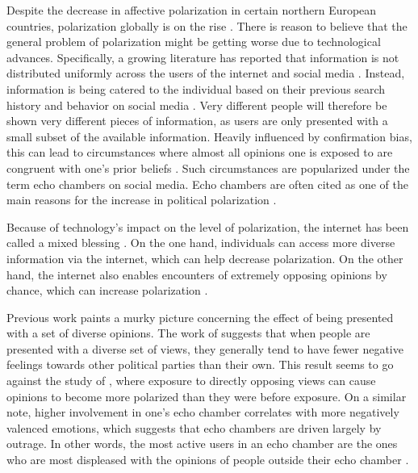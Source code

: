 \documentclass[11pt]{article}
\begin{document}
\noindent Despite the decrease in affective polarization in certain northern European countries, polarization globally is on the rise \cite{boxell_cross-country_2020,mccoy_polarization_2018, somer_deja_2018}. There is reason to believe that the general problem of polarization might be getting worse due to technological advances.
Specifically, a growing literature has reported that information is not distributed uniformly across the users of the internet and social media \cite{taylor_exploring_2018, sasahara_social_2021,baumann_modeling_2020,tsai_echo_2020}. Instead, information is being catered to the individual based on their previous search history and behavior on social media \cite{geschke2019triple}. Very different people will therefore be shown very different pieces of information, as users are only presented with a small subset of the available information. 
Heavily influenced by confirmation bias, this can lead to circumstances where almost all opinions one is exposed to are congruent with one's prior beliefs \cite{baumann_modeling_2020}. Such circumstances are popularized under the term echo chambers on social media. Echo chambers are often cited as one of the main reasons for the increase in political polarization \cite{baumann_modeling_2020, sasahara_social_2021, tsai_echo_2020, geschke2019triple}. 

Because of technology's impact on the level of polarization, the internet has been called a mixed blessing \cite{lev-on_happy_2009}. On the one hand, individuals can access more diverse information via the internet, which can help decrease polarization. On the other hand, the internet also enables encounters of extremely opposing opinions by chance, which can increase polarization \cite{lev-on_happy_2009}.

Previous work paints a murky picture concerning the effect of being presented with a set of diverse opinions. The work of  suggests that when people are presented with a diverse set of views, they generally tend to have fewer negative feelings towards other political parties than their own. This result seems to go against the study of , where exposure to directly opposing views can cause opinions to become more polarized than they were before exposure. 
On a similar note, higher involvement in one's echo chamber correlates with more negatively valenced emotions, which suggests that echo chambers are driven largely by outrage. In other words, the most active users in an echo chamber are the ones who are most displeased with the opinions of people outside their echo chamber \cite{del_vicario_echo_2016}.
\end{document}
